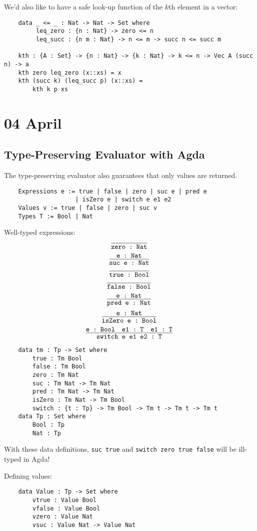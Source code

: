 \documentclass[11pt]{article}
\begin{document}
We'd also like to have a safe look-up function of the $k$th element in a vector:
\begin{verbatim}
    data _ <= _ : Nat -> Nat -> Set where
         leq_zero : {n : Nat} -> zero <= n
         leq_succ : {n m : Nat} -> n <= m -> succ n <= succ m

    kth : {A : Set} -> {n : Nat} -> {k : Nat} -> k <= n -> Vec A (succ n) -> a
    kth zero leq_zero (x::xs) = x
    kth (succ k) (leq_succ p) (x::xs) = 
        kth k p xs
\end{verbatim}

\section{04 April}
\subsection{Type-Preserving Evaluator with Agda}
The type-preserving evaluator also guarantees that only values are returned.
\begin{verbatim}
    Expressions e := true | false | zero | suc e | pred e
                    | isZero e | switch e e1 e2
    Values v := true | false | zero | suc v
    Types T := Bool | Nat
\end{verbatim}

Well-typed expressions:
\[
    \infer{\verb~zero : Nat~}{}
\]
\[
    \infer{\verb~suc e : Nat~}{\verb~e : Nat~}
\]
\[
    \infer{\verb~true : Bool~}{}
\]
\[
    \infer{\verb~false : Bool~}{}
\]
\[
    \infer{\verb~pred e : Nat~}{\verb~e : Nat~}
\]
\[
    \infer{\verb~isZero e : Bool~}{\verb~e : Nat~}
\]
\[
    \infer{\verb~switch e e1 e2 : T~}{
        \verb~e : Bool~
        &
        \verb~e1 : T~
        &
        \verb~e1 : T~
    }
\]

\begin{verbatim}
    data tm : Tp -> Set where
        true : Tm Bool
        false : Tm Bool
        zero : Tm Nat
        suc : Tm Nat -> Tm Nat
        pred : Tm Nat -> Tm Nat
        isZero : Tm Nat -> Tm Bool
        switch : {t : Tp} -> Tm Bool -> Tm t -> Tm t -> Tm t
    data Tp : Set where
        Bool : Tp
        Nat : Tp
\end{verbatim}
With these data definitions, \verb~suc true~ and \verb~switch zero true false~ will be ill-typed in Agda!

Defining values:
\begin{verbatim}
    data Value : Tp -> Set where
        vtrue : Value Bool
        vfalse : Value Bool
        vzero : Value Nat
        vsuc : Value Nat -> Value Nat
\end{verbatim}
\end{document}
